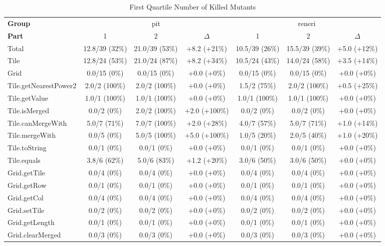 \begin{sidewaystable}
\centering
\caption{First Quartile Number of Killed Mutants}
\label{tab:first_quartile_number_of_killed_mutants}
\begin{tabular}{lcccccc}
\toprule
\textbf{Group} & \multicolumn{3}{c}{pit} & \multicolumn{3}{c}{reneri} \\
\textbf{Part} & 1 & 2 & $\Delta$ & 1 & 2 & $\Delta$ \\
\cmidrule(lr){1-1} \cmidrule(lr){2-4} \cmidrule(lr){5-7}
Total & 12.8/39 (32\%) & 21.0/39 (53\%) & +8.2 (+21\%) & 10.5/39 (26\%) & 15.5/39 (39\%) & +5.0 (+12\%) \\
\cmidrule(lr){1-1} \cmidrule(lr){2-4} \cmidrule(lr){5-7}
Tile & 12.8/24 (53\%) & 21.0/24 (87\%) & +8.2 (+34\%) & 10.5/24 (43\%) & 14.0/24 (58\%) & +3.5 (+14\%) \\
Grid & 0.0/15 (0\%) & 0.0/15 (0\%) & +0.0 (+0\%) & 0.0/15 (0\%) & 0.0/15 (0\%) & +0.0 (+0\%) \\
\cmidrule(lr){1-1} \cmidrule(lr){2-4} \cmidrule(lr){5-7}
Tile.getNearestPower2 & 2.0/2 (100\%) & 2.0/2 (100\%) & +0.0 (+0\%) & 1.5/2 (75\%) & 2.0/2 (100\%) & +0.5 (+25\%) \\
Tile.getValue & 1.0/1 (100\%) & 1.0/1 (100\%) & +0.0 (+0\%) & 1.0/1 (100\%) & 1.0/1 (100\%) & +0.0 (+0\%) \\
Tile.isMerged & 0.0/2 (0\%) & 2.0/2 (100\%) & +2.0 (+100\%) & 0.0/2 (0\%) & 0.0/2 (0\%) & +0.0 (+0\%) \\
Tile.canMergeWith & 5.0/7 (71\%) & 7.0/7 (100\%) & +2.0 (+28\%) & 4.0/7 (57\%) & 5.0/7 (71\%) & +1.0 (+14\%) \\
Tile.mergeWith & 0.0/5 (0\%) & 5.0/5 (100\%) & +5.0 (+100\%) & 1.0/5 (20\%) & 2.0/5 (40\%) & +1.0 (+20\%) \\
Tile.toString & 0.0/1 (0\%) & 0.0/1 (0\%) & +0.0 (+0\%) & 0.0/1 (0\%) & 0.0/1 (0\%) & +0.0 (+0\%) \\
Tile.equals & 3.8/6 (62\%) & 5.0/6 (83\%) & +1.2 (+20\%) & 3.0/6 (50\%) & 3.0/6 (50\%) & +0.0 (+0\%) \\
Grid.getTile & 0.0/4 (0\%) & 0.0/4 (0\%) & +0.0 (+0\%) & 0.0/4 (0\%) & 0.0/4 (0\%) & +0.0 (+0\%) \\
Grid.getRow & 0.0/1 (0\%) & 0.0/1 (0\%) & +0.0 (+0\%) & 0.0/1 (0\%) & 0.0/1 (0\%) & +0.0 (+0\%) \\
Grid.getCol & 0.0/4 (0\%) & 0.0/4 (0\%) & +0.0 (+0\%) & 0.0/4 (0\%) & 0.0/4 (0\%) & +0.0 (+0\%) \\
Grid.setTile & 0.0/2 (0\%) & 0.0/2 (0\%) & +0.0 (+0\%) & 0.0/2 (0\%) & 0.0/2 (0\%) & +0.0 (+0\%) \\
Grid.getLength & 0.0/1 (0\%) & 0.0/1 (0\%) & +0.0 (+0\%) & 0.0/1 (0\%) & 0.0/1 (0\%) & +0.0 (+0\%) \\
Grid.clearMerged & 0.0/3 (0\%) & 0.0/3 (0\%) & +0.0 (+0\%) & 0.0/3 (0\%) & 0.0/3 (0\%) & +0.0 (+0\%) \\
\bottomrule
\end{tabular}
\end{sidewaystable}
